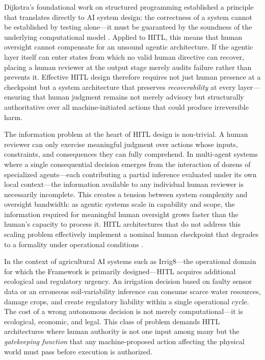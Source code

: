 Dijkstra's foundational work on structured programming established a principle that translates directly to AI system design: the correctness of a system cannot be established by testing alone—it must be guaranteed by the soundness of the underlying computational model \cite{dijkstra1982}. Applied to HITL, this means that human oversight cannot compensate for an unsound agentic architecture. If the agentic layer itself can enter states from which no valid human directive can recover, placing a human reviewer at the output stage merely audits failure rather than prevents it. Effective HITL design therefore requires not just human presence at a checkpoint but a system architecture that preserves \emph{recoverability} at every layer—ensuring that human judgment remains not merely advisory but structurally authoritative over all machine-initiated actions that could produce irreversible harm.

The information problem at the heart of HITL design is non-trivial. A human reviewer can only exercise meaningful judgment over actions whose inputs, constraints, and consequences they can fully comprehend. In multi-agent systems where a single consequential decision emerges from the interaction of dozens of specialized agents—each contributing a partial inference evaluated under its own local context—the information available to any individual human reviewer is necessarily incomplete. This creates a tension between system complexity and oversight bandwidth: as agentic systems scale in capability and scope, the information required for meaningful human oversight grows faster than the human's capacity to process it. HITL architectures that do not address this scaling problem effectively implement a nominal human checkpoint that degrades to a formality under operational conditions \cite{tristr81}.

In the context of agricultural AI systems such as Irrig8—the operational domain for which the \bxthree{} Framework is primarily designed—HITL acquires additional ecological and regulatory urgency. An irrigation decision based on faulty sensor data or an erroneous soil-variability inference can consume scarce water resources, damage crops, and create regulatory liability within a single operational cycle. The cost of a wrong autonomous decision is not merely computational—it is ecological, economic, and legal. This class of problem demands HITL architectures where human authority is not one input among many but the \emph{gatekeeping function} that any machine-proposed action affecting the physical world must pass before execution is authorized.


